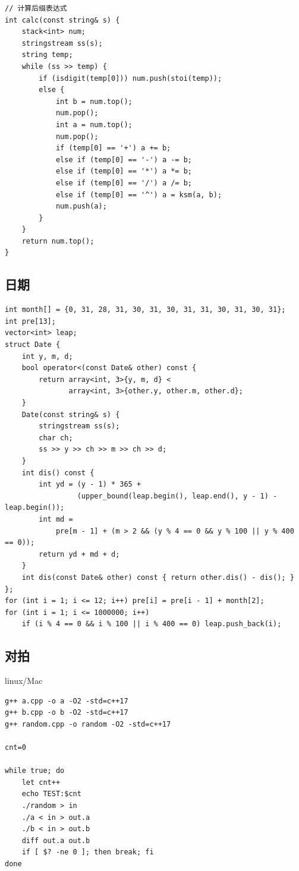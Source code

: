 \documentclass[UTF8]{ctexart}
\begin{document}
\begin{sloppypar}
\begin{lstlisting}[style=cpp]
// 计算后缀表达式
int calc(const string& s) {
    stack<int> num;
    stringstream ss(s);
    string temp;
    while (ss >> temp) {
        if (isdigit(temp[0])) num.push(stoi(temp));
        else {
            int b = num.top();
            num.pop();
            int a = num.top();
            num.pop();
            if (temp[0] == '+') a += b;
            else if (temp[0] == '-') a -= b;
            else if (temp[0] == '*') a *= b;
            else if (temp[0] == '/') a /= b;
            else if (temp[0] == '^') a = ksm(a, b);
            num.push(a);
        }
    }
    return num.top();
}
\end{lstlisting}

\subsection{日期}

\begin{lstlisting}[style=cpp]
int month[] = {0, 31, 28, 31, 30, 31, 30, 31, 31, 30, 31, 30, 31};
int pre[13];
vector<int> leap;
struct Date {
    int y, m, d;
    bool operator<(const Date& other) const {
        return array<int, 3>{y, m, d} <
               array<int, 3>{other.y, other.m, other.d};
    }
    Date(const string& s) {
        stringstream ss(s);
        char ch;
        ss >> y >> ch >> m >> ch >> d;
    }
    int dis() const {
        int yd = (y - 1) * 365 +
                 (upper_bound(leap.begin(), leap.end(), y - 1) - leap.begin());
        int md =
            pre[m - 1] + (m > 2 && (y % 4 == 0 && y % 100 || y % 400 == 0));
        return yd + md + d;
    }
    int dis(const Date& other) const { return other.dis() - dis(); }
};
for (int i = 1; i <= 12; i++) pre[i] = pre[i - 1] + month[2];
for (int i = 1; i <= 1000000; i++)
    if (i % 4 == 0 && i % 100 || i % 400 == 0) leap.push_back(i);
\end{lstlisting}

\subsection{对拍}

linux/Mac

\begin{lstlisting}[style=cpp]
g++ a.cpp -o a -O2 -std=c++17
g++ b.cpp -o b -O2 -std=c++17
g++ random.cpp -o random -O2 -std=c++17

cnt=0

while true; do
    let cnt++
    echo TEST:$cnt
    ./random > in
    ./a < in > out.a
    ./b < in > out.b
    diff out.a out.b
    if [ $? -ne 0 ]; then break; fi
done
\end{lstlisting}


\end{sloppypar}
\end{document}
